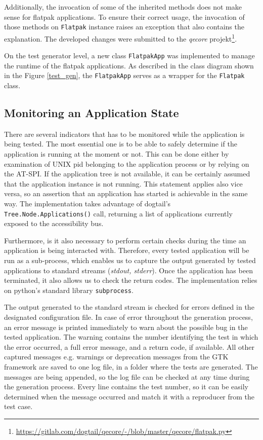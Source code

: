 Additionally, the invocation of some of the inherited methods does not make sense for flatpak applications. To ensure their correct usage, the invocation of those methods on \texttt{Flatpak} instance raises an exception that also contains the explanation. The developed changes were submitted to the \textit{qecore} projekt{\footnote{\url{https://gitlab.com/dogtail/qecore/-/blob/master/qecore/flatpak.py}}}.

On the test generator level, a new class \texttt{FlatpakApp} was implemented to manage the runtime of the flatpak applications. As described in the class diagram shown in the Figure \ref{test_gen}, the \texttt{FlatpakApp} serves as a wrapper for the \texttt{Flatpak} class.

\subsection{Monitoring an Application State}
There are several indicators that has to be monitored while the application is being tested. The most essential one is to be able to safely determine if the application is running at the moment or not. This can be done either by examination of UNIX pid belonging to the application process or by relying on the AT-SPI. If the application tree is not available, it can be certainly assumed that the application instance is not running. This statement applies also vice versa, so an assertion that an application has started is achievable in the same way. The implementation takes advantage of dogtail's \texttt{Tree.Node.Applications()} call, returning a list of applications currently exposed to the accessibility bus.

Furthermore, is it also necessary to perform certain checks during the time an application is being interacted with. Therefore, every tested application will be run as a sub-process, which enables us to capture the output generated by tested applications to standard streams (\textit{stdout, stderr}). Once the application has been terminated, it also allows us to check the return codes. The implementation relies on python's standard library \texttt{subprocess}. 

The output generated to the standard stream is checked for errors defined in the designated configuration file. In case of error throughout the generation process, an error message is printed immediately to warn about the possible bug in the tested application. The warning contains the number identifying the test in which the error occurred, a full error message, and a return code, if available. All other captured messages e.g. warnings or deprecation messages from the GTK framework are saved to one log file, in a folder where the tests are generated. The messages are being appended, so the log file can be checked at any time during the generation process. Every line contains the test number, so it can be easily determined when the message occurred and match it with a reproducer from the test case.

